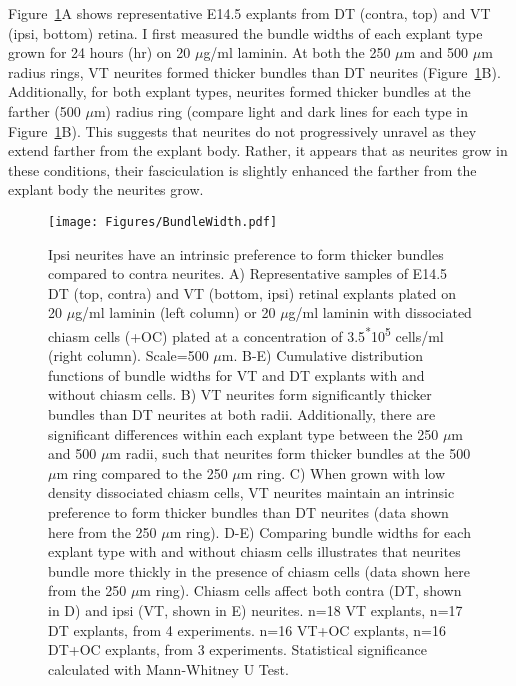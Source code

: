 Figure~\ref{Figures/BundleWidth}A shows representative E14.5 explants from DT (contra, top) and VT (ipsi, bottom) retina.
I first measured the bundle widths of each explant type grown for 24 hours (hr) on 20 $\mu$g/ml laminin.
At both the 250 $\mu$m and 500 $\mu$m radius rings, VT neurites formed thicker bundles than DT neurites (Figure~\ref{Figures/BundleWidth}B).
Additionally, for both explant types, neurites formed thicker bundles at the farther (500 $\mu$m) radius ring (compare light and dark lines for each type in Figure~\ref{Figures/BundleWidth}B).
This suggests that neurites do not progressively unravel as they extend farther from the explant body.
Rather, it appears that as neurites grow in these conditions, their fasciculation is slightly enhanced the farther from the explant body the neurites grow.
\begin{figure}[hbtp]
    \begin{center}
        \texttt{[image: Figures/BundleWidth.pdf]}
        \caption[Ipsi neurites have an intrinsic preference to form thicker bundles \invitro{} compared to contra neurites.]
        {Ipsi neurites have an intrinsic preference to form thicker bundles \invitro{} compared to contra neurites.
        A) Representative samples of E14.5 DT (top, contra) and VT (bottom, ipsi) retinal explants plated on 20 $\mu$g/ml laminin (left column) or 20 $\mu$g/ml laminin with dissociated chiasm cells (+OC) plated at a concentration of 3.5\textsuperscript{*}10\textsuperscript{5} cells/ml (right column).
        Scale=500 $\mu$m.
        B-E) Cumulative distribution functions of bundle widths for VT and DT explants with and without chiasm cells.
        B) VT neurites form significantly thicker bundles than DT neurites at both radii.
        Additionally, there are significant differences within each explant type between the 250 $\mu$m and 500 $\mu$m radii, such that neurites form thicker bundles at the 500 $\mu$m ring compared to the 250 $\mu$m ring.
        C) When grown with low density dissociated chiasm cells, VT neurites maintain an intrinsic preference to form thicker bundles than DT neurites (data shown here from the 250 $\mu$m ring).
        D-E) Comparing bundle widths for each explant type with and without chiasm cells illustrates that neurites bundle more thickly in the presence of chiasm cells (data shown here from the 250 $\mu$m ring).
        Chiasm cells affect both contra (DT, shown in D) and ipsi (VT, shown in E) neurites.
        n=18 VT explants, n=17 DT explants, from 4 experiments.
        n=16 VT+OC explants, n=16 DT+OC explants, from 3 experiments.
        Statistical significance calculated with Mann-Whitney U Test.
        }
        \label{Figures/BundleWidth}
    \end{center}
\end{figure}


